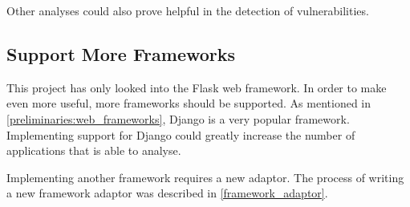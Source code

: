Other analyses could also prove helpful in the detection of vulnerabilities.

\subsection{Support More Frameworks}
This project has only looked into the Flask web framework.
In order to make \pyt{} even more useful, more frameworks should be supported.
As mentioned in \cref{preliminaries:web_frameworks}, Django is a very popular framework.
Implementing support for Django could greatly increase the number of applications that \pyt{} is able to analyse.

Implementing another framework requires a new adaptor.
The process of writing a new framework adaptor was described in \cref{framework_adaptor}.

